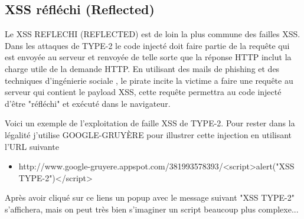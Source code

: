 \bigskip

\subsection{XSS réfléchi (Reflected)}\label{vulnerabilites:web:xss:reflected}

Le XSS REFLECHI (REFLECTED) est de loin la plus commune des failles XSS. Dans les attaques de TYPE-2 le code injecté doit faire partie de la requête qui est envoyée au serveur et renvoyée de telle sorte que la réponse HTTP inclut la charge utile de la demande HTTP. En utilisant des mails de phishing  et des techniques d'ingénierie sociale , le pirate incite la victime a faire une requête au serveur qui contient le payload XSS, cette requête permettra au code injecté d'être "réfléchi" et exécuté dans le navigateur.

\begin{flushleft}
Voici un exemple de l'exploitation de faille XSS de TYPE-2. Pour rester dans la légalité j'utilise GOOGLE-GRUYÈRE pour illustrer cette injection en utilisant l'URL suivante 
\end{flushleft}

\bigskip

\begin{itemize}
\item http://www.google-gruyere.appspot.com/381993578393/<script>alert("XSS TYPE-2")</script>
\end{itemize}

\begin{flushleft}
Après avoir cliqué sur ce liens un popup avec le message suivant "XSS TYPE-2" s'affichera, mais on peut très bien s'imaginer un script beaucoup plus complexe...
\end{flushleft} 

\bigskip


\endinput

